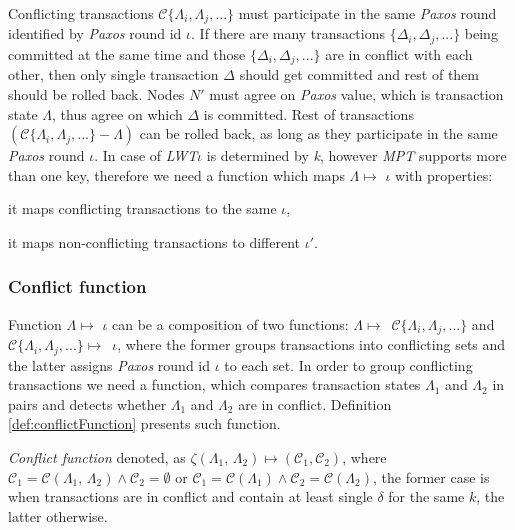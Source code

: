 \documentclass[runningheads,a4paper]{llncs}
\newcommand{\nodesTx}{$\mathit{N'}$\xspace}
\newcommand{\transaction}{$\Delta$\xspace}
\newcommand{\transactions}{$\{\Delta_{i}, \Delta_{j}, ...\}$\xspace}
\newcommand{\txStates}{$\{\Lambda_{i}, \Lambda_{j}, ...\}$\xspace}
\newcommand{\conflictingTxSet}{$\mathcal{C}\text{\txStates}$\xspace}
\newcommand{\paxosRoundId}{$\iota$\xspace}
\newcommand{\txState}{$\Lambda$\xspace}
\newcommand{\txStateOne}{$\Lambda_1$\xspace}
\newcommand{\txStateTwo}{$\Lambda_2$\xspace}
\newcommand{\paxos}{\emph{Paxos}\xspace}
\newcommand{\mpt}{\emph{MPT}\xspace}
\newcommand{\lwt}{\emph{LWT}\xspace}
\begin{document}
Conflicting transactions \conflictingTxSet must participate in the same \paxos round identified by \paxos round id \paxosRoundId. If there are many transactions \transactions being committed at the same time and those \transactions are in conflict with each other, then only single transaction \transaction should get committed and rest of them should be rolled back. Nodes \nodesTx must agree on \paxos value, which is transaction state \txState, thus agree on which \transaction is committed. Rest of transactions $(\mathcal{C}\text{\txStates} - \text{\txState})$ can be rolled back, as long as they participate in the same \paxos round \paxosRoundId. In case of \lwt \paxosRoundId is determined by \emph{k}, however \mpt supports more than one key, therefore we need a function which maps \txState $\mapsto $ \paxosRoundId with properties: 
\begin{enumerate*}[label=\alph*)]
  \item it maps conflicting transactions to the same \paxosRoundId,
  \item it maps non-conflicting transactions to different $\iota'$.
\end{enumerate*}

\subsubsection{Conflict function}

Function \txState $\mapsto $ \paxosRoundId can be a composition of two functions: \mbox{\txState $\mapsto $ \conflictingTxSet} and \mbox{\conflictingTxSet $\mapsto$ \paxosRoundId}, where the former groups transactions into conflicting sets and the latter assigns \paxos round id \paxosRoundId to each set. In order to group conflicting transactions we need a function, which compares transaction states \txStateOne and \txStateTwo in pairs and detects whether \txStateOne and \txStateTwo are in conflict. Definition \ref{def:conflictFunction} presents such function.

\begin{definition}
  \label{def:conflictFunction}
  \emph{Conflict function} denoted, as $\zeta (\text{\txStateOne, \txStateTwo}) \mapsto ( \mathcal{C}_1, \mathcal{C}_2)$, where $\mathcal{C}_1 = \mathcal{C}(\text{\txStateOne, \txStateTwo}) \wedge \mathcal{C}_2 = \emptyset $ or $\mathcal{C}_1 = \mathcal{C}(\text{\txStateOne}) \wedge \mathcal{C}_2=\mathcal{C}(\text{\txStateTwo})$, the former case is when transactions are in conflict and contain at least single $\delta$ for the same $k$, the latter otherwise.
\end{definition}
 
\end{document}
